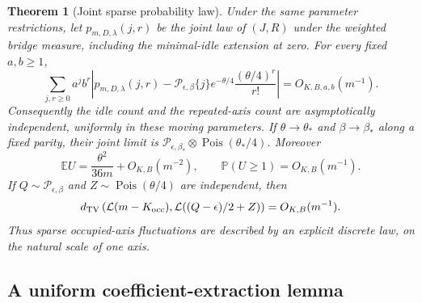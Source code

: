 \documentclass[11pt,letterpaper]{article}
\newtheorem{theorem}{Theorem}[section]
\theoremstyle{remark}\newtheorem{remark}[theorem]{Remark}
\begin{document}
\begin{theorem}[Joint sparse probability law]\label{lcw:ulb:sp:thm:law}
Under the same parameter restrictions, let $p_{m,D,\lambda}(j,r)$
be the joint law of $(J,R)$ under the weighted bridge measure, including
the minimal-idle extension at zero. For every fixed $a,b\geq1$,
\begin{equation}\label{lcw:ulb:sp:eq:l1}
 \sum_{j,r\geq0}a^j b^r
 \left|p_{m,D,\lambda}(j,r)
   -\mathcal P_{\epsilon,\beta}\{j\}
      e^{-\theta/4}\frac{(\theta/4)^r}{r!}\right|
 =O_{K,B,a,b}(m^{-1}).
\end{equation}
Consequently the idle count and the repeated-axis count are
asymptotically independent, uniformly in these moving parameters.
If $\theta\to\theta_*$ and $\beta\to\beta_*$ along a fixed parity,
their joint limit is
$\mathcal P_{\epsilon,\beta_*}\otimes\operatorname{Pois}(\theta_*/4)$.
Moreover
\begin{equation}\label{lcw:ulb:sp:eq:triple}
 \mathbb E U=\frac{\theta^2}{36m}+O_{K,B}(m^{-2}),\qquad
 \mathbb P(U\geq1)=O_{K,B}(m^{-1}).
\end{equation}
If $Q\sim\mathcal P_{\epsilon,\beta}$ and
$Z\sim\operatorname{Pois}(\theta/4)$ are independent, then
\begin{equation}\label{lcw:ulb:sp:eq:deficit}
 d_{\rm TV}\left(\mathcal L(m-K_{\rm occ}),
                 \mathcal L((Q-\epsilon)/2+Z)\right)
 =O_{K,B}(m^{-1}).
\end{equation}
Thus sparse occupied-axis fluctuations are described by an explicit
discrete law, on the natural scale of one axis.
\end{theorem}

\subsection{A uniform coefficient-extraction lemma}
\end{document}
